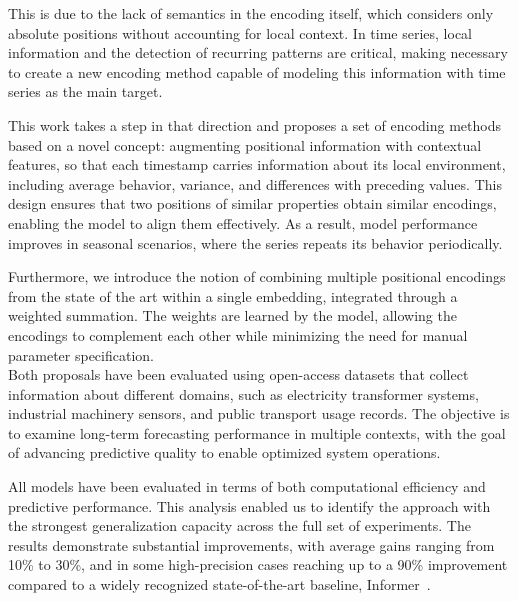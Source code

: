 This is due to the lack of semantics in the encoding itself, which considers only absolute positions without accounting for local context. In time series, local information and the detection of recurring patterns are critical, making necessary to create a new encoding method capable of modeling this information with time series as the main target.\vspace{0.35em}

This work takes a step in that direction and proposes a set of encoding methods based on a novel concept: augmenting positional information with contextual features, so that each timestamp carries information about its local environment, including average behavior, variance, and differences with preceding values. This design ensures that two positions of similar properties obtain similar encodings, enabling the model to align them effectively. As a result, model performance improves in seasonal scenarios, where the series repeats its behavior periodically.\vspace{0.35em}

Furthermore, we introduce the notion of combining multiple positional encodings from the state of the art within a single embedding, integrated through a weighted summation. The weights are learned by the model, allowing the encodings to complement each other while minimizing the need for manual parameter specification.\\
Both proposals have been evaluated using open-access datasets that collect information about different domains, such as electricity transformer systems, industrial machinery sensors, and public transport usage records. The objective is to examine long-term forecasting performance in multiple contexts, with the goal of advancing predictive quality to enable optimized system operations.\vspace{0.35em}

All models have been evaluated in terms of both computational efficiency and predictive performance. This analysis enabled us to identify the approach with the strongest generalization capacity across the full set of experiments. The results demonstrate substantial improvements, with average gains ranging from 10\% to 30\%, and in some high-precision cases reaching up to a 90\% improvement compared to a widely recognized state-of-the-art baseline, Informer~\cite{zhou2021informerefficienttransformerlong}.
\endinput
